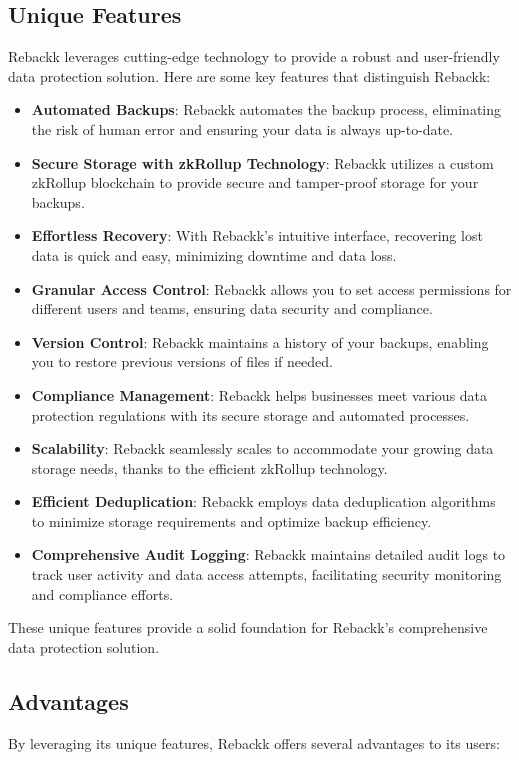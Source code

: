 \documentclass[12pt]{article}
\begin{document}
\subsection{Unique Features}
Rebackk leverages cutting-edge technology to provide a robust and user-friendly data protection solution. Here are some key features that distinguish Rebackk:

\begin{itemize}
    \item \textbf{Automated Backups}: Rebackk automates the backup process, eliminating the risk of human error and ensuring your data is always up-to-date.
    \item \textbf{Secure Storage with zkRollup Technology}: Rebackk utilizes a custom zkRollup blockchain to provide secure and tamper-proof storage for your backups.
    \item \textbf{Effortless Recovery}: With Rebackk's intuitive interface, recovering lost data is quick and easy, minimizing downtime and data loss.
    \item \textbf{Granular Access Control}: Rebackk allows you to set access permissions for different users and teams, ensuring data security and compliance.
    \item \textbf{Version Control}: Rebackk maintains a history of your backups, enabling you to restore previous versions of files if needed.
    \item \textbf{Compliance Management}: Rebackk helps businesses meet various data protection regulations with its secure storage and automated processes.
    \item \textbf{Scalability}: Rebackk seamlessly scales to accommodate your growing data storage needs, thanks to the efficient zkRollup technology.
    \item \textbf{Efficient Deduplication}: Rebackk employs data deduplication algorithms to minimize storage requirements and optimize backup efficiency.
    \item \textbf{Comprehensive Audit Logging}: Rebackk maintains detailed audit logs to track user activity and data access attempts, facilitating security monitoring and compliance efforts.
\end{itemize}

These unique features provide a solid foundation for Rebackk's comprehensive data protection solution.

\subsection{Advantages}
By leveraging its unique features, Rebackk offers several advantages to its users:
\end{document}
